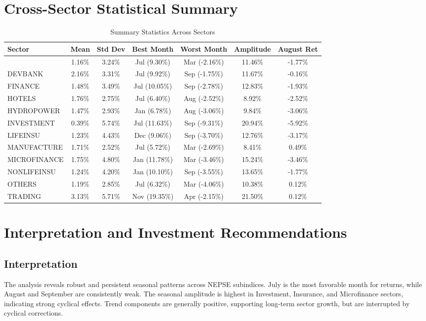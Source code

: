 \documentclass[12pt]{article}
\begin{document}
\section{Cross-Sector Statistical Summary}
\begin{table}[h!]
\centering
\caption{Summary Statistics Across Sectors}
\begin{tabular}{lcccccc}
\toprule
Sector & Mean & Std Dev & Best Month & Worst Month & Amplitude & August Ret \\
\midrule}
BANKING & 1.16\% & 3.24\% & Jul (9.30\%) & Mar (-2.16\%) & 11.46\% & -1.77\% \\
DEVBANK & 2.16\% & 3.31\% & Jul (9.92\%) & Sep (-1.75\%) & 11.67\% & -0.16\% \\
FINANCE & 1.48\% & 3.49\% & Jul (10.05\%) & Sep (-2.78\%) & 12.83\% & -1.93\% \\
HOTELS & 1.76\% & 2.75\% & Jul (6.40\%) & Aug (-2.52\%) & 8.92\% & -2.52\% \\
HYDROPOWER & 1.47\% & 2.93\% & Jan (6.78\%) & Aug (-3.06\%) & 9.84\% & -3.06\% \\
INVESTMENT & 0.39\% & 5.74\% & Jul (11.63\%) & Sep (-9.31\%) & 20.94\% & -5.92\% \\
LIFEINSU & 1.23\% & 4.43\% & Dec (9.06\%) & Sep (-3.70\%) & 12.76\% & -3.17\% \\
MANUFACTURE & 1.71\% & 2.52\% & Jul (5.72\%) & Mar (-2.69\%) & 8.41\% & 0.49\% \\
MICROFINANCE & 1.75\% & 4.80\% & Jan (11.78\%) & Mar (-3.46\%) & 15.24\% & -3.46\% \\
NONLIFEINSU & 1.24\% & 4.20\% & Jan (10.10\%) & Sep (-3.55\%) & 13.65\% & -1.77\% \\
OTHERS & 1.19\% & 2.85\% & Jul (6.32\%) & Mar (-4.06\%) & 10.38\% & 0.12\% \\
TRADING & 3.13\% & 5.71\% & Nov (19.35\%) & Apr (-2.15\%) & 21.50\% & 0.12\% \\
\bottomrule
\end{tabular}
\end{table}

\section{Interpretation and Investment Recommendations}
\subsection{Interpretation}
The analysis reveals robust and persistent seasonal patterns across NEPSE subindices. July is the most favorable month for returns, while August and September are consistently weak. The seasonal amplitude is highest in Investment, Insurance, and Microfinance sectors, indicating strong cyclical effects. Trend components are generally positive, supporting long-term sector growth, but are interrupted by cyclical corrections.
\end{document}

